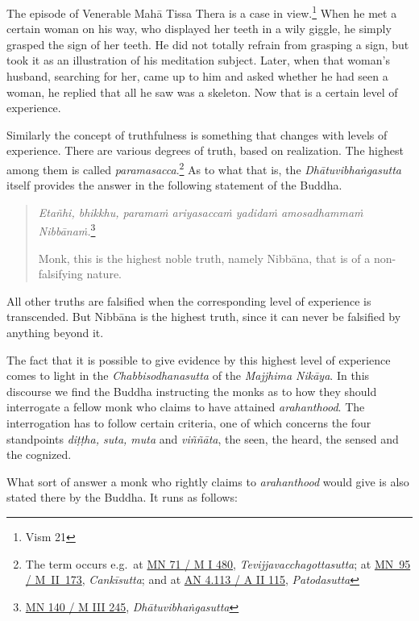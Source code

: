 The episode of Venerable Mahā Tissa Thera is a case in view.\footnote{Vism 21} When he met a certain woman on his way, who displayed her teeth in a wily giggle, he simply grasped the sign of her teeth. He did not totally refrain from grasping a sign, but took it as an illustration of his meditation subject. Later, when that woman's husband, searching for her, came up to him and asked whether he had seen a woman, he replied that all he saw was a skeleton. Now that is a certain level of experience.

Similarly the concept of truthfulness is something that changes with levels of experience. There are various degrees of truth, based on realization. The highest among them is called \emph{paramasacca}.\footnote{The term occurs e.g.~at \href{https://suttacentral.net/mn71/pli/ms}{MN 71 / M I 480}, \emph{Tevijjavacchagottasutta}; at \href{https://suttacentral.net/mn95/pli/ms}{MN~95 / M~II~173}, \emph{Cankīsutta}; and at \href{https://suttacentral.net/an4.113/pli/ms}{AN 4.113 / A II 115}, \emph{Patodasutta}} As to what that is, the \emph{Dhātuvibhaṅgasutta} itself provides the answer in the following statement of the Buddha.

\begin{quote}
\emph{Etañhi, bhikkhu, paramaṁ ariyasaccaṁ yadidaṁ amosadhammaṁ Nibbānaṁ.}\footnote{\href{https://suttacentral.net/mn140/pli/ms}{MN 140 / M III 245}, \emph{Dhātuvibhaṅgasutta}}

Monk, this is the highest noble truth, namely Nibbāna, that is of a non-falsifying nature.
\end{quote}

All other truths are falsified when the corresponding level of experience is transcended. But Nibbāna is the highest truth, since it can never be falsified by anything beyond it.

The fact that it is possible to give evidence by this highest level of experience comes to light in the \emph{Chabbisodhanasutta} of the \emph{Majjhima Nikāya}. In this discourse we find the Buddha instructing the monks as to how they should interrogate a fellow monk who claims to have attained \emph{arahanthood}. The interrogation has to follow certain criteria, one of which concerns the four standpoints \emph{diṭṭha, suta, muta} and \emph{viññāta}, the seen, the heard, the sensed and the cognized.

What sort of answer a monk who rightly claims to \emph{arahanthood} would give is also stated there by the Buddha. It runs as follows:

